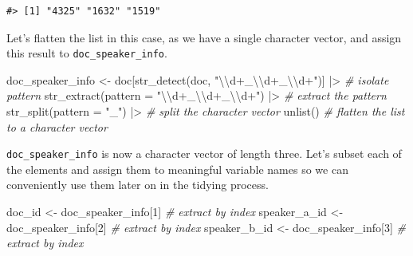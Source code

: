 \documentclass[
  letterpaper,
]{latex/krantz}
\newenvironment{Shaded}{\begin{snugshade}}{\end{snugshade}}
\newcommand{\AttributeTok}[1]{\textcolor[rgb]{0.00,0.00,0.00}{#1}}
\newcommand{\CommentTok}[1]{\textcolor[rgb]{0.00,0.00,0.00}{\textit{#1}}}
\newcommand{\DecValTok}[1]{\textcolor[rgb]{0.00,0.00,0.00}{#1}}
\newcommand{\FunctionTok}[1]{\textcolor[rgb]{0.00,0.00,0.00}{#1}}
\newcommand{\NormalTok}[1]{\textcolor[rgb]{0.00,0.00,0.00}{#1}}
\newcommand{\OtherTok}[1]{\textcolor[rgb]{0.00,0.00,0.00}{#1}}
\newcommand{\SpecialCharTok}[1]{\textcolor[rgb]{0.00,0.00,0.00}{#1}}
\newcommand{\StringTok}[1]{\textcolor[rgb]{0.00,0.00,0.00}{#1}}
\begin{document}
\begin{verbatim}
#> [1] "4325" "1632" "1519"
\end{verbatim}

Let's flatten the list in this case, as we have a single character
vector, and assign this result to \texttt{doc\_speaker\_info}.

\begin{Shaded}
\begin{Highlighting}[]
\NormalTok{doc\_speaker\_info }\OtherTok{\textless{}{-}} 
\NormalTok{  doc[}\FunctionTok{str\_detect}\NormalTok{(doc, }\StringTok{"}\SpecialCharTok{\textbackslash{}\textbackslash{}}\StringTok{d+\_}\SpecialCharTok{\textbackslash{}\textbackslash{}}\StringTok{d+\_}\SpecialCharTok{\textbackslash{}\textbackslash{}}\StringTok{d+"}\NormalTok{)] }\SpecialCharTok{|\textgreater{}} \CommentTok{\# isolate pattern}
  \FunctionTok{str\_extract}\NormalTok{(}\AttributeTok{pattern =} \StringTok{"}\SpecialCharTok{\textbackslash{}\textbackslash{}}\StringTok{d+\_}\SpecialCharTok{\textbackslash{}\textbackslash{}}\StringTok{d+\_}\SpecialCharTok{\textbackslash{}\textbackslash{}}\StringTok{d+"}\NormalTok{) }\SpecialCharTok{|\textgreater{}} \CommentTok{\# extract the pattern}
  \FunctionTok{str\_split}\NormalTok{(}\AttributeTok{pattern =} \StringTok{"\_"}\NormalTok{) }\SpecialCharTok{|\textgreater{}}  \CommentTok{\# split the character vector}
  \FunctionTok{unlist}\NormalTok{() }\CommentTok{\# flatten the list to a character vector}
\end{Highlighting}
\end{Shaded}

\texttt{doc\_speaker\_info} is now a character vector of length three.
Let's subset each of the elements and assign them to meaningful variable
names so we can conveniently use them later on in the tidying process.

\begin{Shaded}
\begin{Highlighting}[]
\NormalTok{doc\_id }\OtherTok{\textless{}{-}}\NormalTok{ doc\_speaker\_info[}\DecValTok{1}\NormalTok{] }\CommentTok{\# extract by index}
\NormalTok{speaker\_a\_id }\OtherTok{\textless{}{-}}\NormalTok{ doc\_speaker\_info[}\DecValTok{2}\NormalTok{] }\CommentTok{\# extract by index}
\NormalTok{speaker\_b\_id }\OtherTok{\textless{}{-}}\NormalTok{ doc\_speaker\_info[}\DecValTok{3}\NormalTok{] }\CommentTok{\# extract by index}
\end{Highlighting}
\end{Shaded}
\end{document}
